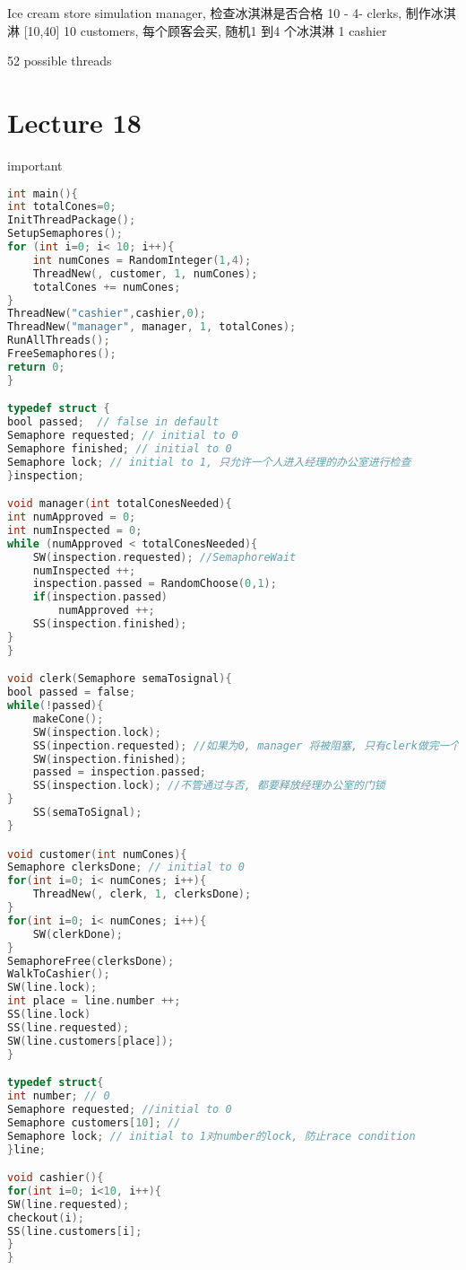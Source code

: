 \documentclass{article}
\begin{document}
Ice cream store simulation
manager, 检查冰淇淋是否合格
10 - 4- clerks, 制作冰淇淋  [10,40]
10 customers, 每个顾客会买, 随机1 到4 个冰淇淋
1 cashier

52 possible threads

\section{Lecture 18} important
\begin{lstlisting}[language = C]
int main(){
int totalCones=0;
InitThreadPackage();
SetupSemaphores();
for (int i=0; i< 10; i++){
	int numCones = RandomInteger(1,4);
	ThreadNew(, customer, 1, numCones);
	totalCones += numCones;
}
ThreadNew("cashier",cashier,0);
ThreadNew("manager", manager, 1, totalCones);
RunAllThreads();
FreeSemaphores();
return 0;
}

typedef struct {
bool passed;  // false in default
Semaphore requested; // initial to 0
Semaphore finished; // initial to 0
Semaphore lock; // initial to 1, 只允许一个人进入经理的办公室进行检查
}inspection;

void manager(int totalConesNeeded){
int numApproved = 0;
int numInspected = 0;
while (numApproved < totalConesNeeded){
	SW(inspection.requested); //SemaphoreWait
	numInspected ++;
	inspection.passed = RandomChoose(0,1);
	if(inspection.passed)
		numApproved ++;
	SS(inspection.finished);
}
}

void clerk(Semaphore semaTosignal){
bool passed = false;
while(!passed){
	makeCone();
	SW(inspection.lock);
	SS(inpection.requested); //如果为0, manager 将被阻塞, 只有clerk做完一个cone, 并且进入经理的办公室,但是这里有一个疑问, 既然已经进入了经理的办公室, 那说明里面没有其他的clerk, 应该说经理可以直接检查, 为什么还需要requeseted 这个信号量呢?
	SW(inspection.finished);
	passed = inspection.passed;
	SS(inspection.lock); //不管通过与否, 都要释放经理办公室的门锁
}
	SS(semaToSignal);
}

void customer(int numCones){
Semaphore clerksDone; // initial to 0
for(int i=0; i< numCones; i++){
	ThreadNew(, clerk, 1, clerksDone);	
}
for(int i=0; i< numCones; i++){
	SW(clerkDone);
}
SemaphoreFree(clerksDone);
WalkToCashier();
SW(line.lock);
int place = line.number ++;
SS(line.lock)
SS(line.requested);
SW(line.customers[place]);
}

typedef struct{
int number; // 0
Semaphore requested; //initial to 0
Semaphore customers[10]; //
Semaphore lock; // initial to 1对number的lock, 防止race condition
}line;

void cashier(){
for(int i=0; i<10, i++){
SW(line.requested);
checkout(i);
SS(line.customers[i];
}
}
\end{lstlisting}
\end{document}
